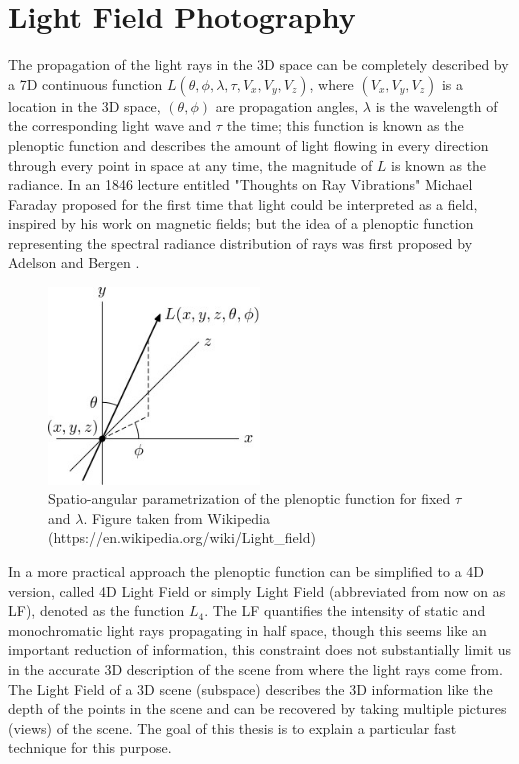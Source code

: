 
\chapter{Light Field Photography}

The propagation of the light rays in the 3D space can be completely described by a 7D continuous function $L(\theta,\phi,\lambda,\tau,V_x,V_y,V_z)$, where $(V_x,V_y,V_z)$ is a location in the 3D space, $(\theta,\phi)$ are propagation angles, $\lambda$ is the wavelength of the corresponding light wave and $\tau$ the time; this function is known as the plenoptic function and describes the amount of light flowing in every direction through every point in space at any time, the magnitude of $L$ is known as the radiance.  In an 1846 lecture entitled "Thoughts on Ray Vibrations" Michael Faraday proposed for the first time that light could be interpreted as a field, inspired by his work on magnetic fields; but the idea of a plenoptic function representing the spectral radiance distribution of rays was first proposed by Adelson and Bergen \cite{Adelson-Plenoptic}. 

\bigskip

\begin{figure}[h!]
\centering
\includegraphics[width=0.5\textwidth]{./Diagrams/Plenoptic_function.jpg}
\caption{Spatio-angular parametrization of the plenoptic function for fixed $\tau$ and $\lambda$. Figure taken from Wikipedia (https://en.wikipedia.org/wiki/Light\_field)}
\end{figure}

\bigskip

In a more practical approach the plenoptic function can be simplified to a 4D version, called 4D Light Field or simply Light Field (abbreviated from now on as LF), denoted as the function $L_4$. The LF quantifies the intensity of static and monochromatic light rays propagating in half space, though this seems like an important reduction of information, this constraint does not substantially limit us in the accurate 3D description of the scene from where the light rays come from. The Light Field of a 3D scene (subspace) describes the 3D information like the depth of the points in the scene and can be recovered by taking multiple pictures (views) of the scene. The goal of this thesis is to explain a particular fast technique for this purpose. 

